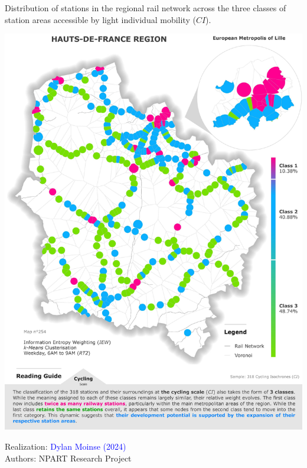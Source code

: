 \begin{refsegment}
\begin{carte}[h!]\vspace*{4pt}
    \caption{Distribution of stations in the regional rail network across the three classes of station areas accessible by light individual mobility (\(CI\)).}
    \label{fig-chap6:classification-gares-cyclable}
    \centerline{\includegraphics[width=1\columnwidth]{src/Figures/Chap-6/EN_NPART_Carte_Classification_CI.jpg}}
    \vspace{5pt}
    \begin{flushright}\scriptsize{
    Realization: \textcolor{blue}{Dylan Moinse (2024)}
    \\
    Authors: \acrshort{NPART} Research Project
    }\end{flushright}
\end{carte}


\end{refsegment}
